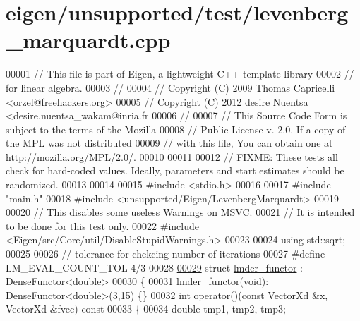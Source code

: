 \hypertarget{eigen_2unsupported_2test_2levenberg__marquardt_8cpp_source}{}\section{eigen/unsupported/test/levenberg\+\_\+marquardt.cpp}
\label{eigen_2unsupported_2test_2levenberg__marquardt_8cpp_source}

\begin{DoxyCode}
00001 \textcolor{comment}{// This file is part of Eigen, a lightweight C++ template library}
00002 \textcolor{comment}{// for linear algebra.}
00003 \textcolor{comment}{//}
00004 \textcolor{comment}{// Copyright (C) 2009 Thomas Capricelli <orzel@freehackers.org>}
00005 \textcolor{comment}{// Copyright (C) 2012 desire Nuentsa <desire.nuentsa\_wakam@inria.fr}
00006 \textcolor{comment}{//}
00007 \textcolor{comment}{// This Source Code Form is subject to the terms of the Mozilla}
00008 \textcolor{comment}{// Public License v. 2.0. If a copy of the MPL was not distributed}
00009 \textcolor{comment}{// with this file, You can obtain one at http://mozilla.org/MPL/2.0/.}
00010 
00011 
00012 \textcolor{comment}{// FIXME: These tests all check for hard-coded values. Ideally, parameters and start estimates should be
       randomized.}
00013 
00014 
00015 \textcolor{preprocessor}{#include <stdio.h>}
00016 
00017 \textcolor{preprocessor}{#include "main.h"}
00018 \textcolor{preprocessor}{#include <unsupported/Eigen/LevenbergMarquardt>}
00019 
00020 \textcolor{comment}{// This disables some useless Warnings on MSVC.}
00021 \textcolor{comment}{// It is intended to be done for this test only.}
00022 \textcolor{preprocessor}{#include <Eigen/src/Core/util/DisableStupidWarnings.h>}
00023 
00024 \textcolor{keyword}{using} std::sqrt;
00025 
00026 \textcolor{comment}{// tolerance for chekcing number of iterations}
00027 \textcolor{preprocessor}{#define LM\_EVAL\_COUNT\_TOL 4/3}
00028 
\hyperlink{structlmder__functor}{00029} \textcolor{keyword}{struct }\hyperlink{structlmder__functor}{lmder\_functor} : DenseFunctor<double>
00030 \{
00031     \hyperlink{structlmder__functor}{lmder\_functor}(\textcolor{keywordtype}{void}): DenseFunctor<double>(3,15) \{\}
00032     \textcolor{keywordtype}{int} operator()(\textcolor{keyword}{const} VectorXd &x, VectorXd &fvec)\textcolor{keyword}{ const}
00033 \textcolor{keyword}{    }\{
00034         \textcolor{keywordtype}{double} tmp1, tmp2, tmp3;

\end{DoxyCode}
